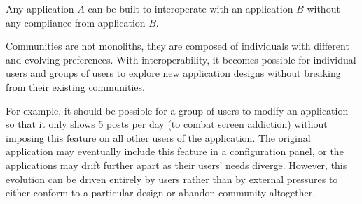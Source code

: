 





\begin{requirement}
\label{requirements:adversarial-interop}
Any application $A$ can be built to interoperate with an application $B$ without any compliance from application $B$.
\end{requirement}

Communities are not monoliths, they are composed of individuals
with different and evolving preferences.
With interoperability, it becomes possible for individual users and groups of users to explore new application designs
without breaking from their existing communities.

For example, it should be possible for a group of users to
modify an application so that it only shows 5 posts per day (to combat screen addiction)
without imposing this feature on all other users of the application.
The original application may eventually include this feature in a configuration panel,
or the applications may drift further apart as their users' needs diverge. However, this
evolution can be driven entirely by users rather than by external pressures
to either conform to a particular design or abandon community altogether.

